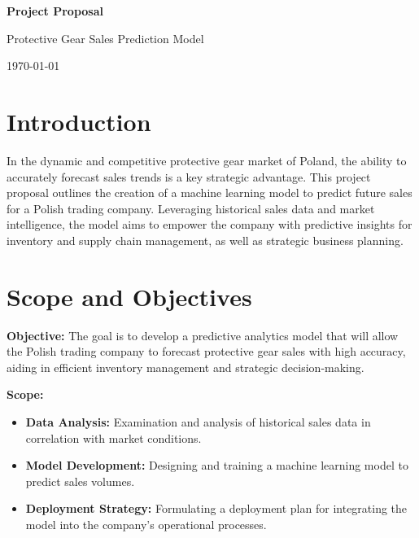 \documentclass{article}
\begin{document}
\begin{titlepage}
    \centering
    \vspace*{4cm}
    {\Huge\bfseries Project Proposal \par}
    \vspace{2cm}
    {\huge Protective Gear Sales Prediction Model\par}
    \vfill
    \vspace{2cm}
    {\large \today\par}
\end{titlepage}

\newpage
\tableofcontents
\newpage    

\section{Introduction}

In the dynamic and competitive protective gear market of Poland, the ability to accurately forecast sales trends is a key strategic advantage. This project proposal outlines the creation of a machine learning model to predict future sales for a Polish trading company. Leveraging historical sales data and market intelligence, the model aims to empower the company with predictive insights for inventory and supply chain management, as well as strategic business planning.

\section{Scope and Objectives}

\textbf{Objective:} The goal is to develop a predictive analytics model that will allow the Polish trading company to forecast protective gear sales with high accuracy, aiding in efficient inventory management and strategic decision-making.

\textbf{Scope:}

\begin{itemize}
  \item \textbf{Data Analysis:} Examination and analysis of historical sales data in correlation with market conditions.
  \item \textbf{Model Development:} Designing and training a machine learning model to predict sales volumes.
  \item \textbf{Deployment Strategy:} Formulating a deployment plan for integrating the model into the company's operational processes.
\end{itemize}
\end{document}

